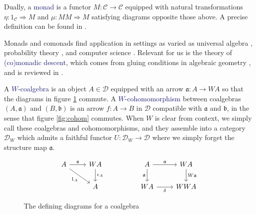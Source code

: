 \documentclass[12pt]{article}
\theoremstyle{definition}
\theoremstyle{theorem}
\newcommand*{\catVarFont}[1]{\mathcal{#1}}
\newcommand{\catC}{\catVarFont{C}}
\newcommand{\catD}{\catVarFont{D}}
\newcommand*{\important}[1]{\textcolor{MidnightBlue}{#1}}
\begin{document}
Dually, a \important{monad} is a functor $M : \catC \to \catC$ equipped with 
natural transformations $\eta : 1_\catC \Rightarrow M$ and 
$\mu : MM \Rightarrow M$ satisfying diagrams opposite those above. A precise
definition can be found in \cite{borceuxCategoriesStructures1994}.

Monads and comonads find application in settings as varied as universal algebra 
\cite{borceuxCategoriesStructures1994, 
adamekAlgebraicTheoriesCategorical2011,
bojanczykRecognisableLanguagesMonads2015,
awodeyCoalgebraicDualBirkhoff2000,
hylandCategoryTheoreticUnderstanding2007}, 
probability theory 
\cite{giryCategoricalApproachProbability1982,
culbertsonCategoricalFoundationBayesian2014,
leinsterCodensityUltrafilterMonad2013}, 
and computer science 
\cite{moggiNotionsComputationMonads1991,
depaivaDialecticaComonads2021,
ghaniAlgebrasCoalgebrasMonads2001,
ruttenUniversalCoalgebraTheory2000}.
Relevant for us is the theory of \important{(co)monadic descent}, 
which comes from gluing conditions in algebraic geometry
\cite{grothendieckTechniqueDescenteTheoremes1960}, and is reviewed in
\cite{borceuxCategoriesStructures1994}.

A \important{$W$-coalgebra} is an object
$A \in \catD$ equipped with an arrow $\mathfrak{a} : A \to WA$ so that the
diagrams in figure \ref{fig:coalg} commute. A \important{$W$-cohomomorphism}
between coalgebras $(A,\mathfrak{a})$ and $(B,\mathfrak{b})$ is an arrow $f : A \to B$
in $\mathcal{D}$ compatible with $\mathfrak{a}$ and $\mathfrak{b}$, in the sense that 
figure \ref{fig:cohom} commutes. When $W$ is clear from context, we simply call these
coalgebras and cohomomorphisms, and they assemble into a category $\catD_W$
which admits a faithful functor $U : \catD_W \to \catD$ where we 
simply forget the structure map $\mathfrak{a}$.

\begin{figure}
    \label{fig:coalg}
    \[
        \begin{tikzcd}
        A & WA && A & WA \\
        & A && WA & WWA
        \arrow["\mathfrak{a}", from=1-1, to=1-2]
        \arrow["{\epsilon_A}", from=1-2, to=2-2]
        \arrow["{1_A}"', from=1-1, to=2-2]
        \arrow["\mathfrak{a}"', from=1-4, to=2-4]
        \arrow["\mathfrak{a}", from=1-4, to=1-5]
        \arrow["\delta"', from=2-4, to=2-5]
        \arrow["W\mathfrak{a}", from=1-5, to=2-5]
        \end{tikzcd}
    \]
    \caption{The defining diagrams for a coalgebra}
\end{figure}
\end{document}
